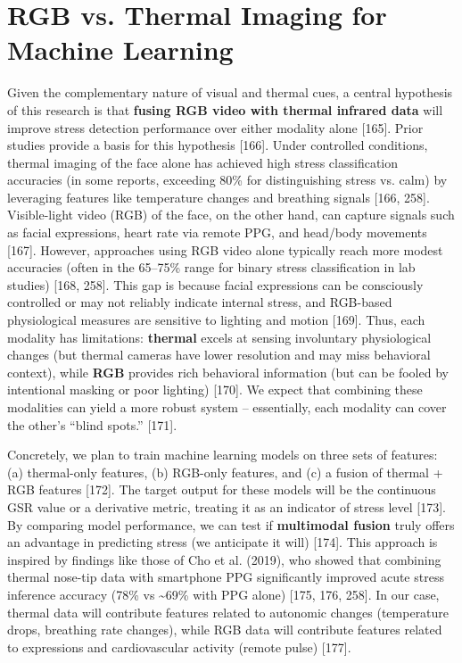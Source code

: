 \documentclass{article}
\begin{document}
    \section{RGB vs. Thermal Imaging for Machine Learning}
    Given the complementary nature of visual and thermal cues, a central hypothesis of this research is that \textbf{fusing RGB video with thermal infrared data} will improve stress detection performance over either modality alone [165]. Prior studies provide a basis for this hypothesis [166]. Under controlled conditions, thermal imaging of the face alone has achieved high stress classification accuracies (in some reports, exceeding 80\% for distinguishing stress vs. calm) by leveraging features like temperature changes and breathing signals [166, 258]. Visible-light video (RGB) of the face, on the other hand, can capture signals such as facial expressions, heart rate via remote PPG, and head/body movements [167]. However, approaches using RGB video alone typically reach more modest accuracies (often in the 65–75\% range for binary stress classification in lab studies) [168, 258]. This gap is because facial expressions can be consciously controlled or may not reliably indicate internal stress, and RGB-based physiological measures are sensitive to lighting and motion [169]. Thus, each modality has limitations: \textbf{thermal} excels at sensing involuntary physiological changes (but thermal cameras have lower resolution and may miss behavioral context), while \textbf{RGB} provides rich behavioral information (but can be fooled by intentional masking or poor lighting) [170]. We expect that combining these modalities can yield a more robust system – essentially, each modality can cover the other’s “blind spots.” [171].

    Concretely, we plan to train machine learning models on three sets of features: (a) thermal-only features, (b) RGB-only features, and (c) a fusion of thermal + RGB features [172]. The target output for these models will be the continuous GSR value or a derivative metric, treating it as an indicator of stress level [173]. By comparing model performance, we can test if \textbf{multimodal fusion} truly offers an advantage in predicting stress (we anticipate it will) [174]. This approach is inspired by findings like those of Cho et al. (2019), who showed that combining thermal nose-tip data with smartphone PPG significantly improved acute stress inference accuracy (78\% vs \textasciitilde69\% with PPG alone) [175, 176, 258]. In our case, thermal data will contribute features related to autonomic changes (temperature drops, breathing rate changes), while RGB data will contribute features related to expressions and cardiovascular activity (remote pulse) [177].
\end{document}
